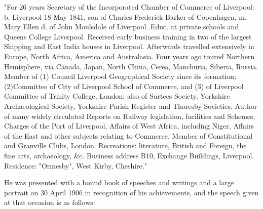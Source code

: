 "For 26 years Secretary of the Incorporated Chamber of Commerce of Liverpool: b. Liverpool 18 May 1841, son of Charles Frederick Barker of Copenhagen, m. Mary Ellen d. of John Moulsdale of Liverpool. Educ. at private schools and Queens College Liverpool. Received early business training in two of the largest Shipping and East India houses in Liverpool. Afterwards travelled extensively in Europe, North Africa, America and Australasia. Four years ago toured Northern Hemisphere, via Canada, Japan, North China, Cerea, Manchuria, Siberia, Russia. Member of (1) Council Liverpool Geographical Society since its formation; (2)Committee of City of Liverpool School of Commerce, and (3) of Liverpool Committee of Trinity College, London; also of Surtees Society, Yorkshire Archaeological Society, Yorkshire Parish Register and Thoresby Societies. Author of many widely circulated Reports on Railway legislation, facilities and Schemes, Charges of the Port of Liverpool, Affairs of West Africa, including Niger, Affairs of the East and other subjects relating to Commerce. Member of Constitutional and Granville Clubs, London. Recreations: literature, British and Foreign, the fine arts, archaeology, \&c. Business address B10, Exchange Buildings, Liverpool. Residence: "Ormesby", West Kirby, Cheshire."

He was presented with a bound book of speeches and writings and a large portrait on 30 April 1906 in recognition of his achievements,  and the speech given at that occasion is as follows:\cite{THBbio}

